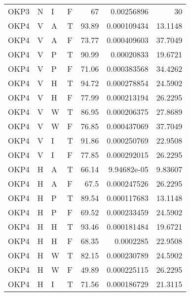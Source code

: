 \begin{longtable}{llllrrr}
    OKP3     & N         & I         & F          & 67         & 0.00256896  & 30       \\
    OKP4     & V         & A         & T          & 93.89      & 0.000109434 & 13.1148  \\
    OKP4     & V         & A         & F          & 73.77      & 0.000409603 & 37.7049  \\
    OKP4     & V         & P         & T          & 90.99      & 0.00020833  & 19.6721  \\
    OKP4     & V         & P         & F          & 71.06      & 0.000383568 & 34.4262  \\
    OKP4     & V         & H         & T          & 94.72      & 0.000278854 & 24.5902  \\
    OKP4     & V         & H         & F          & 77.99      & 0.000213194 & 26.2295  \\
    OKP4     & V         & W         & T          & 86.95      & 0.000206375 & 27.8689  \\
    OKP4     & V         & W         & F          & 76.85      & 0.000437069 & 37.7049  \\
    OKP4     & V         & I         & T          & 91.86      & 0.000250769 & 22.9508  \\
    OKP4     & V         & I         & F          & 77.85      & 0.000292015 & 26.2295  \\
    OKP4     & H         & A         & T          & 66.14      & 9.94682e-05 & 9.83607  \\
    OKP4     & H         & A         & F          & 67.5       & 0.000247526 & 26.2295  \\
    OKP4     & H         & P         & T          & 89.54      & 0.000117683 & 13.1148  \\
    OKP4     & H         & P         & F          & 69.52      & 0.000233459 & 24.5902  \\
    OKP4     & H         & H         & T          & 93.46      & 0.000181484 & 19.6721  \\
    OKP4     & H         & H         & F          & 68.35      & 0.0002285   & 22.9508  \\
    OKP4     & H         & W         & T          & 82.15      & 0.000230789 & 24.5902  \\
    OKP4     & H         & W         & F          & 49.89      & 0.000225115 & 26.2295  \\
    OKP4     & H         & I         & T          & 71.56      & 0.000186729 & 21.3115  \\

\end{longtable}
